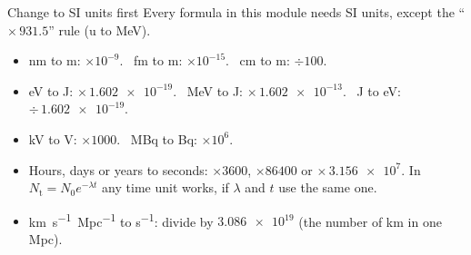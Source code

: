 \begin{toolkit}{Change to SI units first}
Every formula in this module needs SI units, except the ``$\times\,931.5$'' rule (u to MeV).
\begin{itemize}
  \item nm to m: $\times 10^{-9}$. \ fm to m: $\times 10^{-15}$. \ cm to m: $\div 100$.
  \item eV to J: $\times\, \num{1.602e-19}$. \ MeV to J: $\times\, \num{1.602e-13}$.
        \ J to eV: $\div\, \num{1.602e-19}$.
  \item kV to V: $\times 1000$. \ MBq to Bq: $\times 10^6$.
  \item Hours, days or years to seconds: $\times 3600$, $\times \num{86400}$ or
        $\times\, \num{3.156e7}$. In $N_\mathrm{t} = N_0 e^{-\lambda t}$ any time unit
        works, if $\lambda$ and $t$ use the same one.
  \item \si{km.s^{-1}.Mpc^{-1}} to \si{s^{-1}}: divide by $\num{3.086e19}$ (the number of km
        in one Mpc).
\end{itemize}
\end{toolkit}
